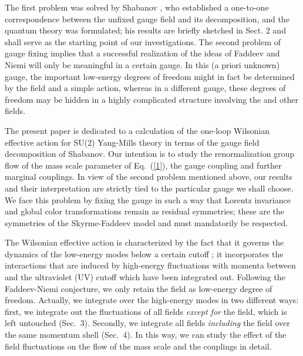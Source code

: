\documentclass[a4paper,12pt]{article}
\providecommand{\re}[1]{~(\ref{#1})}\usepackage{useful_macros}
\begin{document}
The first problem was solved by Shabanov
\cite{Shabanov:1999xy,Shabanov:1999uv}, who established a one-to-one
correspondence between the unfixed gauge field \myHighlight{$\mA_\mu$}\coordHE{} and its
decomposition, and the quantum theory was formulated; his results are
briefly sketched in Sect. 2 and shall serve as the starting point of
our investigations. The second problem of gauge fixing implies that a
successful realization of the ideas of Faddeev and Niemi will only be
meaningful in a certain gauge. In this (a priori unknown) gauge, the
important low-energy degrees of freedom might in fact be determined by
the \myHighlight{$\mn$}\coordHE{} field and a simple action, whereas in a different gauge,
these degrees of freedom may be hidden in a highly complicated
structure involving the \myHighlight{$\mn$}\coordHE{} and other fields.

The present paper is dedicated to a calculation of the one-loop
Wilsonian effective action for SU(2) Yang-Mills theory in terms of the
gauge field decomposition of Shabanov. Our intention is to study the
renormalization group flow of the mass scale parameter of Eq.\re{1},
the gauge coupling and further marginal couplings. In view of the
second problem mentioned above, our results and their interpretation
are strictly tied to the particular gauge we shall choose. We
face this problem by fixing the gauge in such a way that Lorentz
invariance and global color transformations remain as residual
symmetries; these are the symmetries of the Skyrme-Faddeev model and
must mandatorily be respected.

The Wilsonian effective action is characterized by the fact that it
governs the dynamics of the low-energy modes below a certain cutoff
\coordHE{}; it incorporates the interactions that are induced by high-energy
fluctuations with momenta between \coordHE{} and the ultraviolet (UV) cutoff
\myHighlight{$\Lambda$}\coordHE{} which have been integrated out. Following the Faddeev-Niemi
conjecture, we only retain the \myHighlight{$\mn$}\coordHE{} field as low-energy degree of
freedom. Actually, we integrate over the high-energy modes in two
different ways: first, we integrate out the \coordHE{} fluctuations
of all fields {\em except for} the \myHighlight{$\mn$}\coordHE{} field, which is left
untouched (Sec.~3). Secondly, we integrate all fields {\em including}
the \myHighlight{$\mn$}\coordHE{} field over the same momentum shell (Sec.~4). In this way, we
can study the effect of the \myHighlight{$\mn$}\coordHE{} field fluctuations on the flow of
the mass scale and the couplings in detail.
\end{document}
